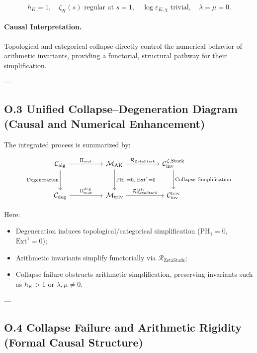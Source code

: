 \documentclass[11pt]{article}
\begin{document}
\[
h_K = 1, \quad \zeta_K(s) \text{ regular at } s = 1, \quad \log \varepsilon_{K,\chi} \text{ trivial}, \quad \lambda = \mu = 0.
\]

\paragraph{Causal Interpretation.}
Topological and categorical collapse directly control the numerical behavior of arithmetic invariants, providing a functorial, structural pathway for their simplification.

---

\subsection*{O.3 Unified Collapse–Degeneration Diagram (Causal and Numerical Enhancement)}

The integrated process is summarized by:

\[
\begin{tikzcd}[column sep=huge, row sep=large]
\mathcal{C}_{\mathrm{alg}} \arrow[r, "{\Pi_{\mathrm{mot}}}"] \arrow[d, "{\mathrm{Degeneration}}"']
& \mathcal{M}_{\mathrm{AK}} \arrow[r, "{\mathcal{R}_{\mathrm{ZetaStark}}}"] \arrow[d, "{\mathrm{PH}_1 = 0,\; \mathrm{Ext}^1 = 0}"]
& \mathcal{C}_{\mathrm{inv}}^{\zeta,\mathrm{Stark}} \arrow[d, "{\mathrm{Collapse\ Simplification}}"] \\
\mathcal{C}_{\mathrm{deg}} \arrow[r, "{\Pi_{\mathrm{mot}}^{\mathrm{deg}}}"]
& \mathcal{M}_{\mathrm{triv}} \arrow[r, "{\mathcal{R}_{\mathrm{ZetaStark}}^{\mathrm{triv}}}"]
& \mathcal{C}_{\mathrm{inv}}^{\mathrm{triv}}
\end{tikzcd}
\]

Here:

\begin{itemize}
  \item Degeneration induces topological/categorical simplification (\( \mathrm{PH}_1 = 0 \), \( \mathrm{Ext}^1 = 0 \));
  \item Arithmetic invariants simplify functorially via \( \mathcal{R}_{\mathrm{ZetaStark}} \);
  \item Collapse failure obstructs arithmetic simplification, preserving invariants such as \( h_K > 1 \) or \( \lambda, \mu \neq 0 \).
\end{itemize}

---

\subsection*{O.4 Collapse Failure and Arithmetic Rigidity (Formal Causal Structure)}
\end{document}
